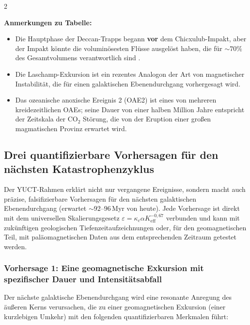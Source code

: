 \documentclass[11pt,a4paper]{article}
\begin{document}
	\begin{multicols}{2}
		
		\noindent
		\textbf{Anmerkungen zu Tabelle:}
		\begin{itemize}
			\item Die Hauptphase der Deccan-Trapps begann \textbf{vor} dem Chicxulub-Impakt,
			aber der Impakt könnte die voluminösesten Flüsse ausgelöst haben, die für
			\(\sim 70\%\) des Gesamtvolumens verantwortlich sind \cite{DeccanTriggering}.
			\item Die Laschamp-Exkursion ist ein rezentes Analogon der Art von magnetischer
			Instabilität, die für einen galaktischen Ebenendurchgang vorhergesagt wird.
			\item Das ozeanische anoxische Ereignis 2 (OAE2) ist eines von mehreren kreidezeitlichen OAEs; seine
			Dauer von einer halben Million Jahre entspricht der Zeitskala der CO\(_2\)
			Störung, die von der Eruption einer großen magmatischen Provinz erwartet wird.
		\end{itemize}
		
		
		\subsection{Drei quantifizierbare Vorhersagen für den nächsten Katastrophenzyklus}
		
		Der YUCT-Rahmen erklärt nicht nur vergangene Ereignisse, sondern macht auch präzise,
		falsifizierbare Vorhersagen für den nächsten galaktischen Ebenendurchgang (erwartet
		\(\sim 92\)–\(96\) Myr von heute). Jede Vorhersage ist direkt mit dem universellen
		Skalierungsgesetz \(\varepsilon = \kappa_c \alpha K_{\mathrm{eff}}^{-0,67}\) verbunden
		und kann mit zukünftigen geologischen Tiefenzeitaufzeichnungen oder, für den
		geomagnetischen Teil, mit paläomagnetischen Daten aus dem entsprechenden Zeitraum getestet werden.
		
		\subsubsection{Vorhersage 1: Eine geomagnetische Exkursion mit spezifischer Dauer und Intensitätsabfall}
		
		Der nächste galaktische Ebenendurchgang wird eine resonante Anregung des
		äußeren Kerns verursachen, die zu einer geomagnetischen Exkursion (einer kurzlebigen Umkehr)
		mit den folgenden quantifizierbaren Merkmalen führt:
		

\end{multicols}
\end{document}
